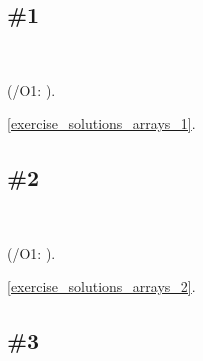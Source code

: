 \section{\Exercises}

\subsection{\Exercise \#1}
\label{exercise_array_1}

\WhatThisCodeDoes\



(/O1: ).







\Answer\: \ref{exercise_solutions_arrays_1}.

\subsection{\Exercise \#2}
\label{exercise_array_2}

\WhatThisCodeDoes\



(/O1: ).







\Answer\: \ref{exercise_solutions_arrays_2}.

\subsection{\Exercise \#3}
\label{exercise_array_3}

